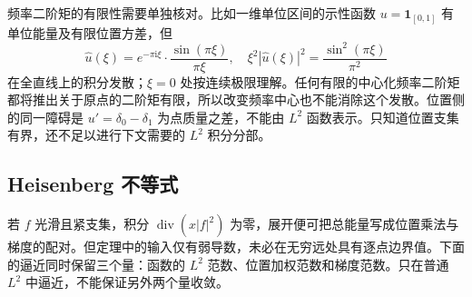 频率二阶矩的有限性需要单独核对。比如一维单位区间的示性函数 \(u=\mathbf1_{[0,1]}\) 有单位能量及有限位置方差，但
\[
 \widehat u(\xi)
 =e^{-\pi\mathrm i\xi}\cdot\frac{\sin(\pi\xi)}{\pi\xi},
 \quad
 \xi^2|\widehat u(\xi)|^2=\frac{\sin^2(\pi\xi)}{\pi^2}
\]
在全直线上的积分发散；\(\xi=0\) 处按连续极限理解。任何有限的中心化频率二阶矩都将推出关于原点的二阶矩有限，所以改变频率中心也不能消除这个发散。位置侧的同一障碍是 \(u'=\delta_0-\delta_1\) 为点质量之差，不能由 \(L^2\) 函数表示。只知道位置支集有界，还不足以进行下文需要的 \(L^2\) 积分分部。

\subsection{Heisenberg 不等式}
\label{b2:subsec:200104}

若 \(f\) 光滑且紧支集，积分 \(\operatorname{div}(x|f|^2)\) 为零，展开便可把总能量写成位置乘法与梯度的配对。但定理中的输入仅有弱导数，未必在无穷远处具有逐点边界值。下面的逼近同时保留三个量：函数的 \(L^2\) 范数、位置加权范数和梯度范数。只在普通 \(L^2\) 中逼近，不能保证另外两个量收敛。

